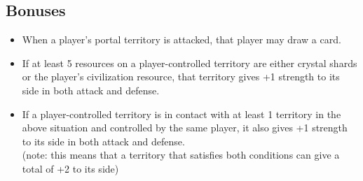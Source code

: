 \documentclass[a4paper]{article}
\begin{document}
    \subsection{Bonuses}
        \begin{itemize}
            \item When a player's portal territory is attacked,
                that player may draw a card.
            \item If at least 5 resources on a player-controlled territory are either
                crystal shards or the player's civilization resource,
                that territory gives +1 strength to its side in both attack and defense.
            \item If a player-controlled territory is in contact with at least 1 territory
                in the above situation and controlled by the same player,
                it also gives +1 strength to its side in both attack and defense.\\
                (note: this means that a territory that satisfies both conditions
                can give a total of +2 to its side)
        \end{itemize}
        
\newpage
\end{document}
